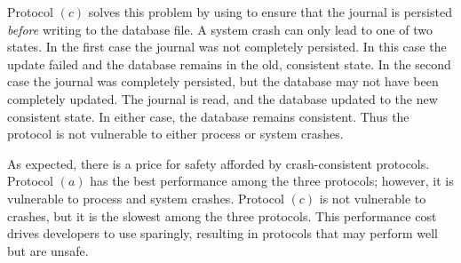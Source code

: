 Protocol $(c)$ solves this problem by using  to ensure that
the journal is persisted \textit{before} writing to the database file. A system
crash can only lead to one of two states. In the first case the journal was not
completely persisted.  In this case the update failed and the database remains
in the old, consistent state. In the second case the journal was completely
persisted, but the database may not have been completely updated.  The
journal is read, and the database updated to the new consistent state.
In either case, the database remains consistent. Thus the protocol is not
vulnerable to either process or system crashes.  

As expected, there is a price for safety afforded by crash-consistent
protocols. Protocol $(a)$ has the best performance among the three protocols;
however, it is vulnerable to process and system crashes. Protocol $(c)$ is not
vulnerable to crashes, but it is the slowest among the three protocols. This
performance cost drives developers to use  sparingly, resulting
in protocols that may perform well but are unsafe.
